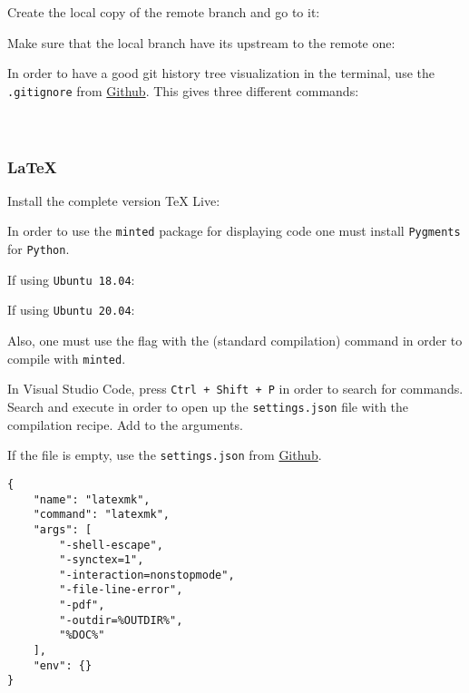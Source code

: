 
Create the local copy of the remote branch and go to it:


Make sure that the local branch have its upstream to the remote one:



In order to have a good git history tree visualization in the terminal, use the \texttt{.gitignore} from \href{https://github.com/robinhellmers/computer_setup/blob/master/git_setup/gitconfig}{Github}. This gives three different commands:\\
\\
\\

\subsubsection{LaTeX}

Install the complete version TeX Live:


In order to use the \texttt{minted} package for displaying code one must install \texttt{Pygments} for \texttt{Python}.

If using \texttt{Ubuntu 18.04}:


If using \texttt{Ubuntu 20.04}:


Also, one must use the  flag with the  (standard compilation) command in order to compile with \texttt{minted}.

In Visual Studio Code, press \texttt{Ctrl + Shift + P} in order to search for commands. Search and execute  in order to open up the \texttt{settings.json} file with the compilation recipe. Add  to the arguments.

If the file is empty, use the \texttt{settings.json} from \href{https://github.com/robinhellmers/computer_setup/blob/master/latex-workshop/settings.json}{Github}.

\begin{verbatim}
{
    "name": "latexmk",
    "command": "latexmk",
    "args": [
        "-shell-escape",
        "-synctex=1",
        "-interaction=nonstopmode",
        "-file-line-error",
        "-pdf",
        "-outdir=%OUTDIR%",
        "%DOC%"
    ],
    "env": {}
}
\end{verbatim}

